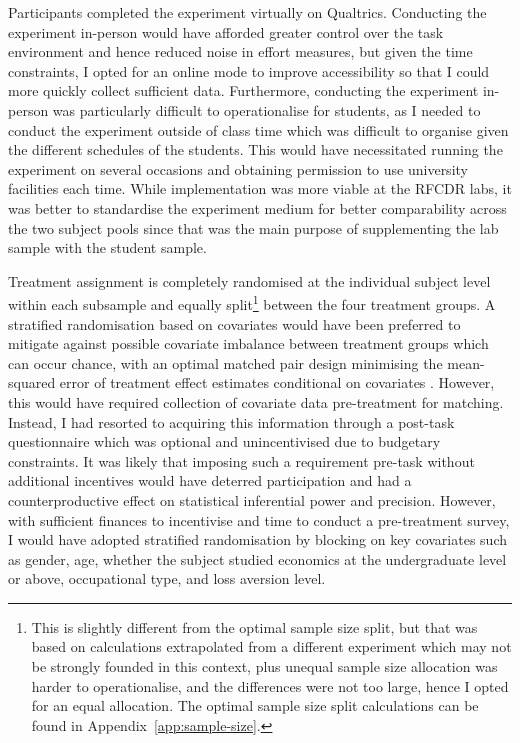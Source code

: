 \documentclass[12pt, letterpaper]{article}
\begin{document}
Participants completed the experiment virtually on Qualtrics. Conducting the experiment in-person would have afforded greater control over the task environment and hence reduced noise in effort measures, but given the time constraints, I opted for an online mode to improve accessibility so that I could more quickly collect sufficient data. Furthermore, conducting the experiment in-person was particularly difficult to operationalise for students, as I needed to conduct the experiment outside of class time which was difficult to organise given the different schedules of the students. This would have necessitated running the experiment on several occasions and obtaining permission to use university facilities each time. While implementation was more viable at the RFCDR labs, it was better to standardise the experiment medium for better comparability across the two subject pools since that was the main purpose of supplementing the lab sample with the student sample.

Treatment assignment is completely randomised at the individual subject level within each subsample and equally split\footnote{This is slightly different from the optimal sample size split, but that was based on calculations extrapolated from a different experiment which may not be strongly founded in this context, plus unequal sample size allocation was harder to operationalise, and the differences were not too large, hence I opted for an equal allocation. The optimal sample size split calculations can be found in Appendix~\ref{app:sample-size}.} between the four treatment groups. A stratified randomisation based on covariates would have been preferred to mitigate against possible covariate imbalance between treatment groups which can occur chance, with an optimal matched pair design minimising the mean-squared error of treatment effect estimates conditional on covariates \parencite{bai.2022.optimalitymatchedpair}. However, this would have required collection of covariate data pre-treatment for matching. Instead, I had resorted to acquiring this information through a post-task questionnaire which was optional and unincentivised due to budgetary constraints. It was likely that imposing such a requirement pre-task without additional incentives would have deterred participation and had a counterproductive effect on statistical inferential power and precision. However, with sufficient finances to incentivise and time to conduct a pre-treatment survey, I would have adopted stratified randomisation by blocking on key covariates such as gender, age, whether the subject studied economics at the undergraduate level or above, occupational type, and loss aversion level.
\end{document}
